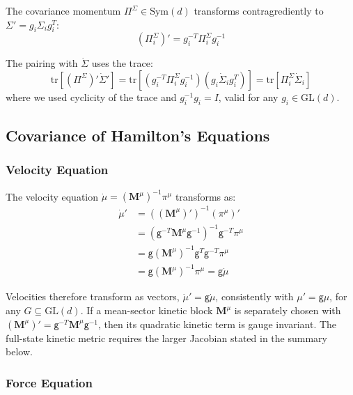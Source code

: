 \documentclass[12pt]{article}
\begin{document}
The covariance momentum $\Pi^\Sigma \in \mathrm{Sym}(d)$ transforms contragrediently to $\Sigma' = g_i\Sigma_i g_i^T$:
\begin{equation}
\boxed{(\Pi_i^\Sigma)' = g_i^{-T} \Pi_i^\Sigma g_i^{-1}}
\end{equation}

The pairing with $\dot{\Sigma}$ uses the trace:
\begin{equation}
\mathrm{tr}[(\Pi^\Sigma)'\dot{\Sigma}'] = \mathrm{tr}[(g_i^{-T}\Pi_i^\Sigma g_i^{-1})(g_i\dot{\Sigma}_i g_i^T)] = \mathrm{tr}[\Pi_i^\Sigma\dot{\Sigma}_i]
\end{equation}
where we used cyclicity of the trace and $g_i^{-1} g_i = I$, valid for any $g_i \in \mathrm{GL}(d)$.

\subsection{Covariance of Hamilton's Equations}

\subsubsection{Velocity Equation}

The velocity equation $\dot{\mu} = (\mathbf{M}^\mu)^{-1}\pi^\mu$ transforms as:
\begin{align}
\dot{\mu}' &= ((\mathbf{M}^\mu)')^{-1}(\pi^\mu)' \nonumber\\
&= (\mathsf g^{-T}\mathbf{M}^\mu\mathsf g^{-1})^{-1}\mathsf g^{-T}\pi^\mu \nonumber\\
&= \mathsf g(\mathbf{M}^\mu)^{-1}\mathsf g^{T}\mathsf g^{-T}\pi^\mu \nonumber\\
&= \mathsf g(\mathbf{M}^\mu)^{-1}\pi^\mu = \mathsf g\dot{\mu}
\end{align}

Velocities therefore transform as vectors, $\dot{\mu}'=\mathsf g\dot{\mu}$, consistently with $\mu'=\mathsf g\mu$, for any $G\subseteq\mathrm{GL}(d)$. If a mean-sector kinetic block $\mathbf M^\mu$ is separately chosen with $(\mathbf M^\mu)'=\mathsf g^{-T}\mathbf M^\mu\mathsf g^{-1}$, then its quadratic kinetic term is gauge invariant. The full-state kinetic metric requires the larger Jacobian stated in the summary below.

\subsubsection{Force Equation}
\end{document}
